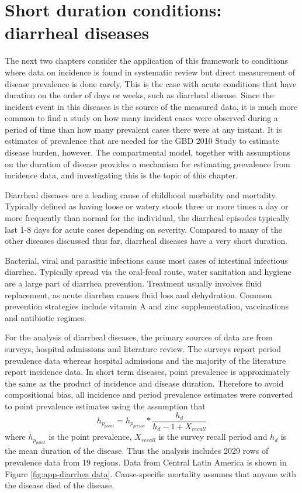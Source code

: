 \chapter{Short duration conditions: diarrheal diseases}
\label{applications-short_dur}

The next two chapters consider the application of this framework to
conditions where data on incidence is found in systematic review but
direct measurement of disease prevalence is done rarely.  This is the
case with acute conditions that have duration on the order of days or
weeks, such as diarrheal disease.  Since the incident event in this
diseases is the source of the measured data, it is much more common to
find a study on how many incident cases were observed during a period
of time than how many prevalent cases there were at any instant.  It
is estimates of prevalence that are needed for the GBD 2010 Study to
estimate disease burden, however.  The compartmental model, together
with assumptions on the duration of disease provides a mechanism for
estimating prevalence from incidence data, and investigating this is
the topic of this chapter.

Diarrheal diseases are a leading cause of childhood morbidity and
mortality.  Typically defined as having loose or watery stools three
or more times a day or more frequently than normal for the individual,
the diarrheal episodes typically last 1-8 days for acute cases
depending on severity. \cite{unicef_diarrhoea_2009,
  carlos_etiology_1990, lamberti_systematic_2012} Compared to many of
the other diseases discussed thus far, diarrheal diseases have a very
short duration.

Bacterial, viral and parasitic infections cause most cases of
intestinal infectious diarrhea.  Typically spread via the oral-fecal
route, water sanitation and hygiene are a large part of diarrhea
prevention.  Treatment usually involves fluid replacement, as acute
diarrhea causes fluid loss and dehydration.  Common prevention
strategies include vitamin A and zinc supplementation, vaccinations
and antibiotic regimes. \cite{wardlaw_diarrhoea:_2010,
  carlos_etiology_1990, lamberti_systematic_2012}

For the analysis of diarrheal diseases, the primary sources of data
are from surveys, hospital admissions and literature review.  The
surveys report period prevalence data whereas hospital admissions and
the majority of the literature report incidence data.  In short term
diseases, point prevalence is approximately the same as the product of
incidence and disease duration.  Therefore to avoid compositional
bias, all incidence and period prevalence estimates were converted to
point prevalence estimates using the assumption that
    \begin{equation}
    	h_{p_{point}}=h_{p_{period}} *
        \frac{h_{d}}{h_{d}-1+X_{recall}}
    \end{equation}
where $h_{p_{point}}$ is the point prevalence, $X_{recall}$ is the
survey recall period and $h_{d}$ is the mean duration of the disease.
Thus the analysis includes 2029 rows of prevalence data from 19
regions.  Data from Central Latin America is shown in Figure
\ref{fig:app-diarrhea data}.  Cause-specific mortality assumes that
anyone with the disease died of the disease.

